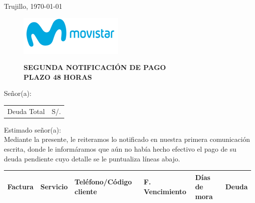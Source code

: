 %
%
\vspace*{0.2cm}
\begin{flushright}
    Trujillo, \today
\end{flushright}
\vspace{-0.5cm}

\begin{figure}[h]
\begin{minipage}[b]{5.106458333cm}
\includegraphics[natwidth=5.106458333cm, natheight=1.931458333cm]{resources/business_logo.png}
\end{minipage}
\begin{minipage}[b][1.9314cm][t]{11cm}
\hfill
\begin{flushright}
{\LARGE \bf SEGUNDA NOTIFICACIÓN DE PAGO\\PLAZO 48 HORAS}
\end{flushright}
\end{minipage}
\end{figure}

\noindent
Señor(a):\\

\begin{flushright}
\bf \large
\begin{tabular}{|p{3.2cm} p{3.2cm}|}
\hline
Deuda Total & S/. %
\hline
\end{tabular}
\end{flushright}

\noindent
Estimado señor(a):\\
Mediante la presente, le reiteramos lo notificado en nuestra primera comunicación escrita, donde le informáramos que aún no había hecho efectivo el pago de su deuda pendiente cuyo detalle se le puntualiza líneas abajo.

\begin{center}
\scriptsize
\begin{tabular}{|x{1.2cm}|x{2cm}|x{3.5cm}|x{2.5cm}|x{2cm}|x{2cm}|}
\hline
\textbf{Factura} & \textbf{Servicio} & \textbf{Teléfono/Código cliente} & \textbf{F. Vencimiento} & \textbf{Días de mora} & \textbf{Deuda} \\
\hline
\hline
\end{tabular}
\end{center}

